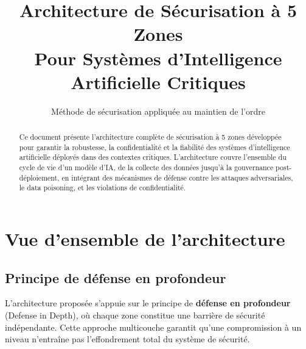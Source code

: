 \documentclass[11pt,a4paper]{article}
\title{\Huge\bfseries Architecture de Sécurisation à 5 Zones\\[0.5em]
\Large Pour Systèmes d'Intelligence Artificielle Critiques}
\author{Méthode de sécurisation appliquée au maintien de l'ordre}
\date{}
\begin{document}
\maketitle

\begin{abstract}
Ce document présente l'architecture complète de sécurisation à 5 zones développée pour garantir la robustesse, la confidentialité et la fiabilité des systèmes d'intelligence artificielle déployés dans des contextes critiques. L'architecture couvre l'ensemble du cycle de vie d'un modèle d'IA, de la collecte des données jusqu'à la gouvernance post-déploiement, en intégrant des mécanismes de défense contre les attaques adversariales, le data poisoning, et les violations de confidentialité.
\end{abstract}

\tableofcontents
\newpage

\section{Vue d'ensemble de l'architecture}

\subsection{Principe de défense en profondeur}

L'architecture proposée s'appuie sur le principe de \textbf{défense en profondeur} (Defense in Depth), où chaque zone constitue une barrière de sécurité indépendante. Cette approche multicouche garantit qu'une compromission à un niveau n'entraîne pas l'effondrement total du système de sécurité.
\end{document}
